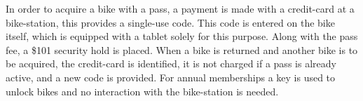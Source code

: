 In order to acquire a bike with a pass, a payment is made with a credit-card at a bike-station, this provides a single-use code.
This code is entered on the bike itself, which is equipped with a tablet solely for this purpose.
Along with the pass fee, a \$101 security hold is placed.
When a bike is returned and another bike is to be acquired, the credit-card is identified, it is not charged if a pass is already active, and a new code is provided.
For annual memberships a key is used to unlock bikes and no interaction with the bike-station is needed.
